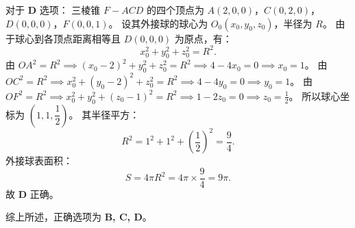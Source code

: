 {  对于 \textbf{D} 选项：
  三棱锥 $F - ACD$ 的四个顶点为 $A(2,0,0)$，$C(0,2,0)$，$D(0,0,0)$，$F(0,0,1)$。
  设其外接球的球心为 $O_0(x_0, y_0, z_0)$，半径为 $R$。
  由于球心到各顶点距离相等且 $D(0,0,0)$ 为原点，有：
  \[ x_0^2 + y_0^2 + z_0^2 = R^2. \]
  由 $OA^2 = R^2 \implies (x_0 - 2)^2 + y_0^2 + z_0^2 = R^2 \implies 4 - 4x_0 = 0 \implies x_0 = 1$。
  由 $OC^2 = R^2 \implies x_0^2 + (y_0 - 2)^2 + z_0^2 = R^2 \implies 4 - 4y_0 = 0 \implies y_0 = 1$。
  由 $OF^2 = R^2 \implies x_0^2 + y_0^2 + (z_0 - 1)^2 = R^2 \implies 1 - 2z_0 = 0 \implies z_0 = \frac{1}{2}$。
  所以球心坐标为 $\left(1, 1, \dfrac{1}{2}\right)$。
  其半径平方：
  \[ R^2 = 1^2 + 1^2 + \left(\frac{1}{2}\right)^2 = \frac{9}{4}. \]
  外接球表面积：
  \[ S = 4\pi R^2 = 4\pi \times \frac{9}{4} = 9\pi. \]
  故 \textbf{D} 正确。
  
  综上所述，正确选项为 \textbf{B, C, D}。
}

\newcommand{\qSolidCubeDynamicSphereDiagnosis}{%
  本题综合考查立体几何的动态面判定、表面爬行展开最值、等体积转换以及外接球求法。常见问题是判断链条不完整，或相关公式与模型之间的对应关系不够扎实。
}

\newcommand{\qSolidCubeDynamicSphereTeachingNotes}{%
  \item \textbf{难点剖析}：
    \begin{itemize}
      \item A 选项：演示如何通过空间向量法（求平面法向量）把线面平行转化为向量垂直方程，算出 $x=1$ 的物理含义；
      \item B 选项：讲解蚂蚁爬行表面展开的“剪开”原理，画出平面展开直角三角形；
      \item C 选项：强调等体积转换法把动点 $P$ 所在底面移到高，简化体积计算；
      \item D 选项：通过空间直角坐标系建立关于球心坐标的方程组，是求不规则四面体外接球最稳定、最通用的方法。
    \end{itemize}
}
